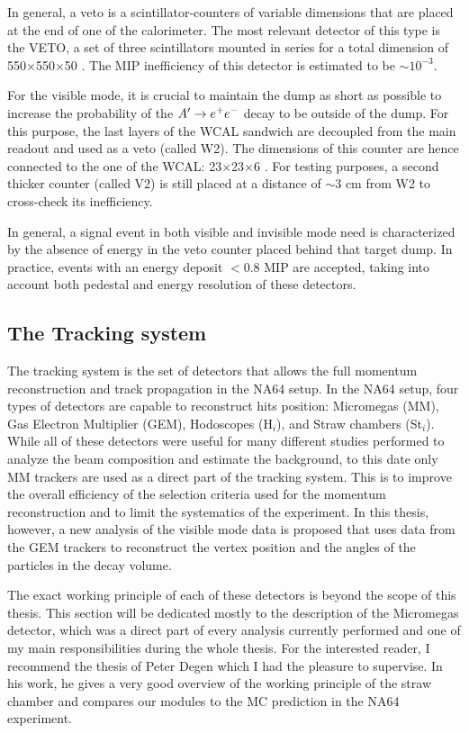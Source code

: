 In general, a veto is a scintillator-counters of variable dimensions that are placed at the end of one of the calorimeter. The most relevant detector of this type is the VETO, a set of three scintillators mounted in series for a total dimension of 550$\times$550$\times$50 \mmc. The MIP inefficiency of this detector is estimated to be $\sim 10^{-3}$.

For the visible mode, it is crucial to maintain the dump as short as possible to increase the probability of the $A' \to e^+e^-$ decay to be outside of the dump. For this purpose, the last layers of the WCAL sandwich are decoupled from the main readout and used as a veto (called W2). The dimensions of this counter are hence connected to the one of the WCAL: 23$\times$23$\times$6 \mmc. For testing purposes, a second thicker counter (called V2) is still placed at a distance of $\sim3$ \si{cm} from W2 to cross-check its inefficiency.

In general, a signal event in both visible and invisible mode need is characterized by the absence of energy in the veto counter placed behind that target dump. In practice, events with an energy deposit $<$0.8 MIP are accepted, taking into account both pedestal and energy resolution of these detectors.

\subsection{The Tracking system}
\label{ch2:sec:detectors-tracking}

The tracking system is the set of detectors that allows the full momentum reconstruction and track propagation in the NA64 setup. In the NA64 setup, four types of detectors are capable to reconstruct hits position: Micromegas (MM), Gas Electron Multiplier (GEM), Hodoscopes (H$_i$), and Straw chambers (St$_i$). While all of these detectors were useful for many different studies performed to analyze the beam composition and estimate the background, to this date only MM trackers are used as a direct part of the tracking system. This is to improve the overall efficiency of the selection criteria used for the momentum reconstruction and to limit the systematics of the experiment. In this thesis, however, a new analysis of the visible mode data is proposed that uses data from the GEM trackers to reconstruct the vertex position and the angles of the particles in the decay volume.

The exact working principle of each of these detectors is beyond the scope of this thesis. This section will be dedicated mostly to the description of the Micromegas detector, which was a direct part of every analysis currently performed and one of my main responsibilities during the whole thesis. For the interested reader, I recommend the thesis of Peter Degen \cite{pdegen-thesis} which I had the pleasure to supervise. In his work, he gives a very good overview of the working principle of the straw chamber and compares our modules to the MC prediction in the NA64 experiment.

